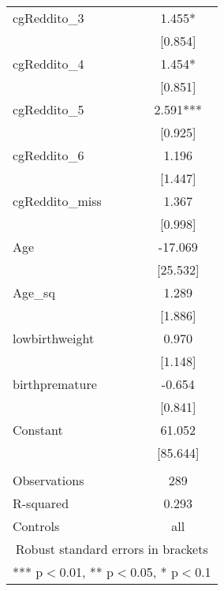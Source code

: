 \documentclass[]{article}
\begin{document}
\begin{tabular}{lc}
cgReddito\_3 & 1.455* \\
 & [0.854] \\
cgReddito\_4 & 1.454* \\
 & [0.851] \\
cgReddito\_5 & 2.591*** \\
 & [0.925] \\
cgReddito\_6 & 1.196 \\
 & [1.447] \\
cgReddito\_miss & 1.367 \\
 & [0.998] \\
Age & -17.069 \\
 & [25.532] \\
Age\_sq & 1.289 \\
 & [1.886] \\
lowbirthweight & 0.970 \\
 & [1.148] \\
birthpremature & -0.654 \\
 & [0.841] \\
Constant & 61.052 \\
 & [85.644] \\
 &  \\
Observations & 289 \\
R-squared & 0.293 \\
 Controls & all \\ \hline
\multicolumn{2}{c}{ Robust standard errors in brackets} \\
\multicolumn{2}{c}{ *** p$<$0.01, ** p$<$0.05, * p$<$0.1} \\
\end{tabular}
\end{document}
